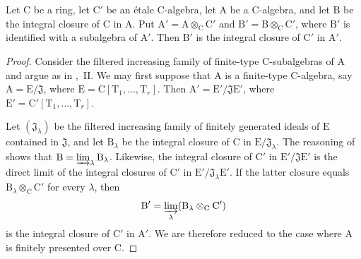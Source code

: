 \begin{proposition}[18.12.15]
\label{IV.18.12.15}
Let $\mathrm{C}$ be a ring, let $\mathrm{C}'$ be an \'etale $\mathrm{C}$-algebra, let $\mathrm{A}$ be a $\mathrm{C}$-algebra, and let $\mathrm{B}$ be the integral closure of $\mathrm{C}$ in $\mathrm{A}$. Put $\mathrm{A}'=\mathrm{A}\otimes_\mathrm{C}\mathrm{C}'$ and $\mathrm{B}'=\mathrm{B}\otimes_\mathrm{C}\mathrm{C}'$, where $\mathrm{B}'$ is identified with a subalgebra of $\mathrm{A}'$. Then $\mathrm{B}'$ is the integral closure of $\mathrm{C}'$ in $\mathrm{A}'$.
\end{proposition}

\begin{proof}
Consider the filtered increasing family of finite-type $\mathrm{C}$-subalgebras of $\mathrm{A}$ and argue as in ,~II. We may first suppose that $\mathrm{A}$ is a finite-type $\mathrm{C}$-algebra, say $\mathrm{A}=\mathrm{E}/\mathfrak{J}$, where $\mathrm{E}=\mathrm{C}[\mathrm{T}_1,\ldots,\mathrm{T}_r]$. Then $\mathrm{A}'=\mathrm{E}'/\mathfrak{J}\mathrm{E}'$, where $\mathrm{E}'=\mathrm{C}'[\mathrm{T}_1,\ldots,\mathrm{T}_r]$.

Let $(\mathfrak{J}_\lambda)$ be the filtered increasing family of finitely generated ideals of $\mathrm{E}$ contained in $\mathfrak{J}$, and let $\mathrm{B}_\lambda$ be the integral closure of $\mathrm{C}$ in $\mathrm{E}/\mathfrak{J}_\lambda$. The reasoning of  shows that $\mathrm{B}=\varinjlim_\lambda\mathrm{B}_\lambda$. Likewise, the integral closure of $\mathrm{C}'$ in $\mathrm{E}'/\mathfrak{J}\mathrm{E}'$ is the direct limit of the integral closures of $\mathrm{C}'$ in $\mathrm{E}'/\mathfrak{J}_\lambda\mathrm{E}'$. If the latter closure equals $\mathrm{B}_\lambda\otimes_\mathrm{C}\mathrm{C}'$ for every $\lambda$, then
\[
  \mathrm{B}'=\varinjlim_\lambda
  (\mathrm{B}_\lambda\otimes_\mathrm{C}\mathrm{C}')
\]
is the integral closure of $\mathrm{C}'$ in $\mathrm{A}'$. We are therefore reduced to the case where $\mathrm{A}$ is finitely presented over $\mathrm{C}$.


\end{proof}
